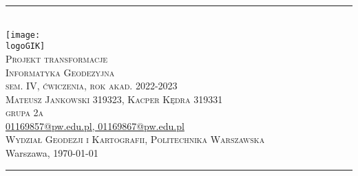 \documentclass[10pt,a4paper]{article}
\makeatletter
\newcommand{\logoGIK}{settings/WGiK-znak.png}
\newcommand{\authorName}{Mateusz Jankowski 319323, Kacper Kędra 319331  \\ grupa 2a}
\newcommand{\titeReport}{Projekt transformacje} %
\newcommand{\titleLecture}{Informatyka Geodezyjna \\ sem. IV, ćwiczenia, rok akad. 2022-2023} %
\newcommand{\mymail}{\href{mailto:01169857@pw.edu.pl,01169867@pw.edu.pl}{01169857@pw.edu.pl, 01169867@pw.edu.pl}}
\newcommand{\faculty}{Wydział Geodezji i Kartografii}
\newcommand{\university}{Politechnika Warszawska}
\newcommand{\city}{Warszawa}
\makeatother
\begin{document}
\begin{center} 
\rule{\textwidth}{.5pt} \\
\vspace{1.0cm}
    \texttt{[image: \\logoGIK]}
\vspace{0.5cm} \\
	\Large \textsc{\titeReport}
\vspace{0.5cm} \\  
	\large \textsc{\titleLecture}
\vspace{0.5cm}\\
	\textsc{\authorName}  \\
	\mymail \\
	\textsc{\faculty}, \textsc{\university}  \\ 
	 \city, \today
\end{center} 
\rule{\textwidth}{1.5pt}



\tableofcontents 								%
\newpage
%










\end{document}
